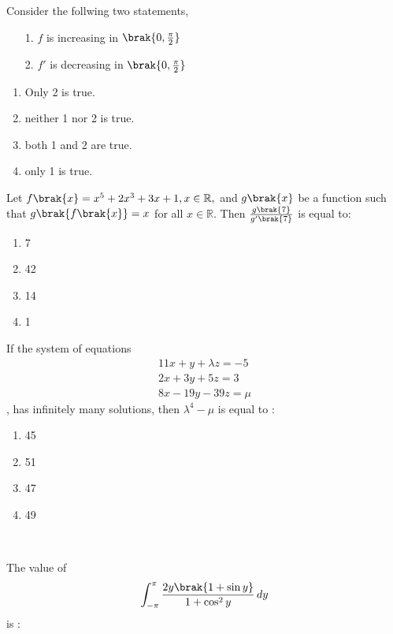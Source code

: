     Consider the follwing two statements,
    \begin{enumerate}
        \item[1.] $f$ is increasing in $\brak{0, \frac{\pi}{2}}$
        \item[2.] $f'$ is decreasing in $\brak{0, \frac{\pi}{2}}$
    \end{enumerate}
		\hfill{}
		\begin{enumerate}
			\item Only 2 is true.
			\item  neither 1 nor 2 is true.
			\item  both 1 and 2 are true.
			\item only 1 is true.
		\end{enumerate}
    \item Let $f\brak{x} = x^5 + 2x^3 + 3x + 1, x \in \mathbb{R},$ and $g\brak{x}$ be a function 
        such that $g\brak{f\brak{x}} = x$ for all $x \in \mathbb{R}$. Then $\frac{g\brak{7}}{g'\brak{7}}$
        is equal to:
		\hfill{}
        \begin{multicols}{4}
            
		\begin{enumerate}
			\item 7 \columnbreak
			\item 42 \columnbreak 
			\item 14 \columnbreak
			\item 1
		\end{enumerate}
        \end{multicols}
\item If the system of equations 
		\begin{align}
            11x + y + \lambda z = -5 \\
            2x + 3y + 5z = 3 \\
            8x - 19y - 39z = \mu
		\end{align}, has infinitely many solutions, then $\lambda ^ 4 - \mu$ is equal to :
        \hfill{}
		\begin{multicols}{4}
		\begin{enumerate}
			\item 45 \columnbreak
			\item 51 \columnbreak 
			\item 47 \columnbreak
			\item 49
		\end{enumerate}
        \end{multicols}
		\
\item The value of 
    \begin{align}
        \int_{-\pi} ^{\pi} \frac{2y\brak{1 + \sin y}}{1 + \cos ^2 y} \, dy 
    \end{align} is :
		\hfill{}
		
